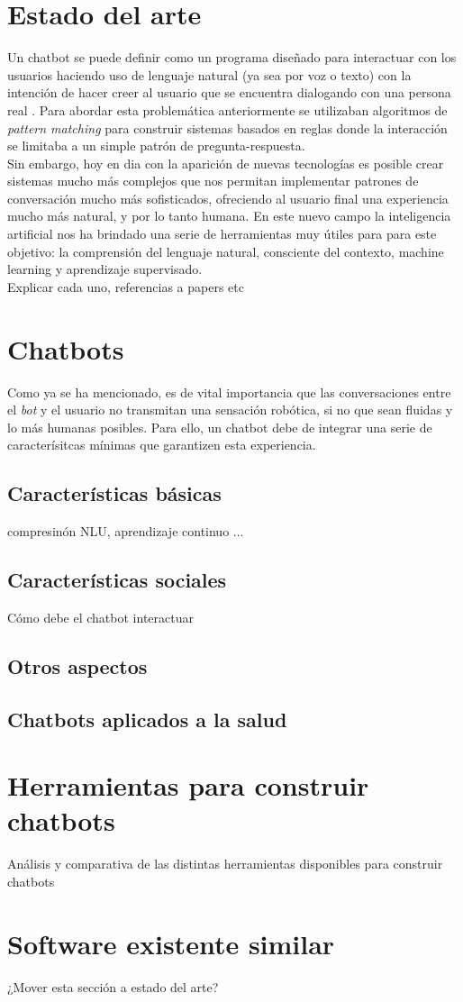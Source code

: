 \section{Estado del arte}
Un chatbot se puede definir como un programa diseñado para interactuar con los usuarios haciendo uso de lenguaje natural (ya sea por voz o texto) con la intención de hacer creer al usuario que se encuentra dialogando con una persona real \cite{designTechniques}. Para abordar esta problemática anteriormente se utilizaban algoritmos de \textit{pattern matching} para construir sistemas basados en reglas donde la interacción se limitaba a un simple patrón de pregunta-respuesta. \\

Sin embargo, hoy en dia con la aparición de nuevas tecnologías es posible crear sistemas mucho más complejos que nos permitan implementar patrones de conversación mucho más sofisticados, ofreciendo al usuario final una experiencia mucho más natural, y por lo tanto humana. En este nuevo campo la inteligencia artificial nos ha brindado una serie de herramientas muy útiles para para este objetivo: la comprensión del lenguaje natural, consciente del contexto, machine learning y  aprendizaje supervisado. \\

Explicar cada uno, referencias a papers etc


\section{Chatbots}
Como ya se ha mencionado, es de vital importancia que las conversaciones entre el \textit{bot} y el usuario no transmitan una sensación robótica, si no que sean fluidas y lo más humanas posibles. Para ello, un chatbot debe de integrar una serie de caracterísitcas mínimas que garantizen esta experiencia.


\subsection{Características básicas}
compresinón NLU, aprendizaje continuo ...

\subsection{Características sociales} 
Cómo debe el chatbot interactuar

\subsection{Otros aspectos} 


\subsection{Chatbots aplicados a la salud} 

\section{Herramientas para construir chatbots}
Análisis y comparativa de las distintas herramientas disponibles para construir chatbots

\section{Software existente similar}
¿Mover esta sección a estado del arte? 
